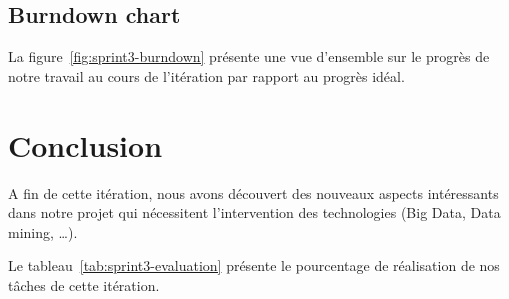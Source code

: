 \subsection{Burndown chart}

La figure~\ref{fig:sprint3-burndown} présente une vue d'ensemble sur le progrès
de notre travail au cours de l'itération par rapport au progrès idéal.



\section*{Conclusion}

A fin de cette itération, nous avons découvert des nouveaux aspects intéressants dans notre projet
qui nécessitent l'intervention des technologies (Big Data, Data mining, \ldots).

Le tableau~\ref{tab:sprint3-evaluation} présente le pourcentage de
réalisation de nos tâches de cette itération.

